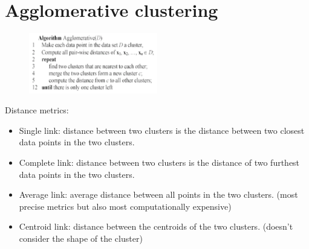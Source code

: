 \documentclass[10pt,oneside,a4paper]{article}
\begin{document}
\section{Agglomerative clustering}
\begin{figure}[H]
    \centering
    \includegraphics[width=0.5\textwidth]{Images/Agglomerative_clustering.png}
\end{figure}

Distance metrics:
\begin{itemize}
    \item Single link: distance between two clusters is the distance between two closest data points in the two clusters.
    \item Complete link: distance between two clusters is the distance of two furthest data points in the two clusters.
    \item Average link: average distance between all points in the two clusters. (most precise metrics but also most computationally expensive)
    \item Centroid link: distance between the centroids of the two clusters. (doesn't consider the shape of the cluster)
\end{itemize}


\end{document}
